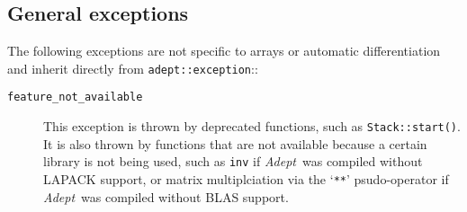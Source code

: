 \documentclass[a4,oneside]{book}
\def\codesize{\small}
\def\Adept{\emph{Adept}}
\def\code#1{{\codesize\texttt{#1}}}
\def\citem#1{\item[{\codesize\texttt{#1}}]}
\begin{document}
\subsection{General exceptions}
The following exceptions are not specific to arrays or automatic
differentiation and inherit directly from \code{adept::exception}::
\begin{description}
\citem{feature\_not\_available} This exception is thrown by deprecated
functions, such as \code{Stack::start()}. It is also thrown by
functions that are not available because a certain library is not
being used, such as \code{inv} if \Adept\ was compiled without LAPACK
support, or matrix multiplciation via the `\code{**}' psudo-operator
if \Adept\ was compiled without BLAS support.
\end{description}
\end{document}
